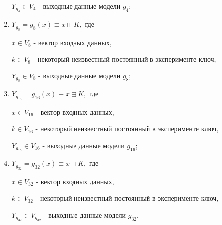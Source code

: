 \begin{enumerate}
	$Y_{g_4} \in V_{4}$ - выходные данные модели $g_4$;
	\bigskip
	
	\item
	$Y_{g_8} = g_8(x) \equiv x \boxplus K,$ где
	
	$x \in V_{8}$ - вектор входных данных,
	
	$k \in V_{8}$ - некоторый неизвестный постоянный в эксперименте ключ,
	
	$Y_{g_8} \in V_{8}$ - выходные данные модели $g_8$;
	\bigskip
	
	\item
	$Y_{g_{16}} = g_{16}(x) \equiv x \boxplus K,$ где
	
	$x \in V_{16}$ - вектор входных данных,
	
	$k \in V_{16}$ - некоторый неизвестный постоянный в эксперименте ключ,
	
	$Y_{g_{16}} \in V_{16}$ - выходные данные модели $g_{16}$;
	\bigskip
	
	\item
	$Y_{g_{32}} = g_{32}(x) \equiv x \boxplus K,$ где
	
	$x \in V_{32}$ - вектор входных данных,
	
	$k \in V_{32}$ - некоторый неизвестный постоянный в эксперименте ключ,
	
	$Y_{g_{32}} \in V_{g_{32}}$ - выходные данные модели $g_{32}$.
	\bigskip
	
\end{enumerate}

